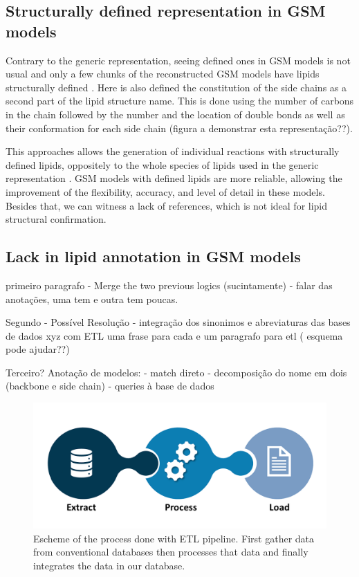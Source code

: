 \documentclass{llncs}
\begin{document}
\subsection{Structurally defined representation in GSM models}
Contrary to the generic representation, seeing defined ones in GSM models is not usual and only a few chunks of the reconstructed GSM models have lipids structurally defined \cite{Schutzhold}.
Here is also defined the constitution of the side chains as a second part of the lipid structure name. This is done using the number of carbons in the chain followed by the number and the location of double bonds as well as their conformation for each side chain (figura a demonstrar esta representação??).

This approaches allows the generation of individual reactions with structurally defined lipids, oppositely to the whole species of lipids used in the generic representation \cite{Aung2013}.
GSM models with defined lipids are more reliable,  allowing the improvement of the flexibility, accuracy, and level of detail in these models.
Besides that, we can witness a lack of references, which is not ideal for lipid structural confirmation.

\subsection{Lack in lipid annotation in GSM models}
primeiro paragrafo
- Merge the two previous logics (sucintamente)
- falar das anotações, uma tem e outra tem poucas.

Segundo
- Possível Resolução
    - integração dos sinonimos e abreviaturas das bases de dados xyz com ETL
    uma frase para cada e um paragrafo para etl ( esquema pode ajudar??)

Terceiro?   
Anotação de modelos:
    - match direto
    - decomposição do nome em dois (backbone e side chain) - queries à base de dados
\begin{figure}
    \includegraphics[width=\textwidth]{imagens/ETL.png}
    \caption{Escheme of the process done with ETL pipeline.
    First gather data from conventional databases
    then processes that data
    and finally integrates the data in our database.} \label{fig2}    
\end{figure}







\end{document}
